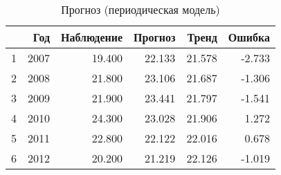 \begin{table}[ht]
\centering
\begin{tabular}{rrrrrr}
  \hline
 & Год & Наблюдение & Прогноз & Тренд & Ошибка \\ 
  \hline
1 & 2007 & 19.400 & 22.133 & 21.578 & -2.733 \\ 
  2 & 2008 & 21.800 & 23.106 & 21.687 & -1.306 \\ 
  3 & 2009 & 21.900 & 23.441 & 21.797 & -1.541 \\ 
  4 & 2010 & 24.300 & 23.028 & 21.906 & 1.272 \\ 
  5 & 2011 & 22.800 & 22.122 & 22.016 & 0.678 \\ 
  6 & 2012 & 20.200 & 21.219 & 22.126 & -1.019 \\ 
   \hline
\end{tabular}
\caption{Прогноз (периодическая модель)} 
\label{table:per-fit-cv-prediction}
\end{table}
